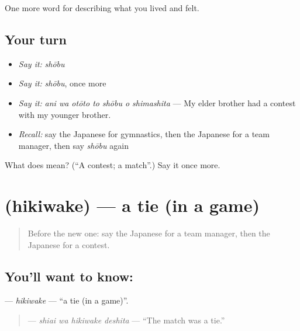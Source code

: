 \begin{grammarlens}[title={What you've built}]
One more word for describing what you lived and felt.
\end{grammarlens}

\subsection*{Your turn}
\begin{itemize}
\raggedright
  \item \emph{Say it:} \emph{shōbu}
  \item \emph{Say it:} \emph{shōbu}, once more
  \item \emph{Say it:} \emph{ani wa otōto to shōbu o shimashita} — My elder brother had a contest with my younger brother.
  \item \emph{Recall:} say the Japanese for gymnastics, then the Japanese for a team manager, then say \emph{shōbu} again
\end{itemize}

\begin{tcolorbox}[breakable,colback=teal!4,colframe=teal!35!black,title={Before you move on}]
What does  mean? (\textquotedblleft{}A contest; a match\textquotedblright{}.) Say it once more.
\end{tcolorbox}
\section[\texorpdfstring{\ja{ひきわけ} (hikiwake)}{ひきわけ (hikiwake)}]{ (hikiwake) — a tie (in a game)}

\label{lesson:JA-C462-hikiwake}



\begin{quote}
Before the new one: say the Japanese for a team manager, then the Japanese for a contest.
\end{quote}

\subsection*{You'll want to know: }
\textbf{} — \emph{hikiwake} — \textquotedblleft{}a tie (in a game)\textquotedblright{}.

\begin{quote}
\textbf{ } — \emph{shiai wa hikiwake deshita} — \textquotedblleft{}The match was a tie.\textquotedblright{}
\end{quote}

